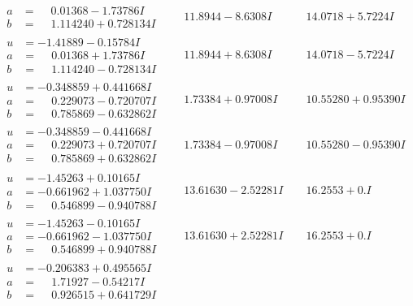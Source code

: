 \documentclass[1p]{elsarticle_modified}
\theoremstyle{definition}
\begin{document}
$$\begin{array}{c|c|c}
\begin{aligned}
a &= \phantom{-}0.01368 - 1.73786 I \\
b &= \phantom{-}1.114240 + 0.728134 I\end{aligned}
 & \phantom{-}11.8944 - 8.6308 I & \phantom{-}14.0718 + 5.7224 I \\ \hline\begin{aligned}
u &= -1.41889 - 0.15784 I \\
a &= \phantom{-}0.01368 + 1.73786 I \\
b &= \phantom{-}1.114240 - 0.728134 I\end{aligned}
 & \phantom{-}11.8944 + 8.6308 I & \phantom{-}14.0718 - 5.7224 I \\ \hline\begin{aligned}
u &= -0.348859 + 0.441668 I \\
a &= \phantom{-}0.229073 - 0.720707 I \\
b &= \phantom{-}0.785869 - 0.632862 I\end{aligned}
 & \phantom{-}1.73384 + 0.97008 I & \phantom{-}10.55280 + 0.95390 I \\ \hline\begin{aligned}
u &= -0.348859 - 0.441668 I \\
a &= \phantom{-}0.229073 + 0.720707 I \\
b &= \phantom{-}0.785869 + 0.632862 I\end{aligned}
 & \phantom{-}1.73384 - 0.97008 I & \phantom{-}10.55280 - 0.95390 I \\ \hline\begin{aligned}
u &= -1.45263 + 0.10165 I \\
a &= -0.661962 + 1.037750 I \\
b &= \phantom{-}0.546899 - 0.940788 I\end{aligned}
 & \phantom{-}13.61630 - 2.52281 I & \phantom{-}16.2553 + 0. I\phantom{ +0.000000I} \\ \hline\begin{aligned}
u &= -1.45263 - 0.10165 I \\
a &= -0.661962 - 1.037750 I \\
b &= \phantom{-}0.546899 + 0.940788 I\end{aligned}
 & \phantom{-}13.61630 + 2.52281 I & \phantom{-}16.2553 + 0. I\phantom{ +0.000000I} \\ \hline\begin{aligned}
u &= -0.206383 + 0.495565 I \\
a &= \phantom{-}1.71927 - 0.54217 I \\
b &= \phantom{-}0.926515 + 0.641729 I\end{aligned}

\end{array}$$
\end{document}
